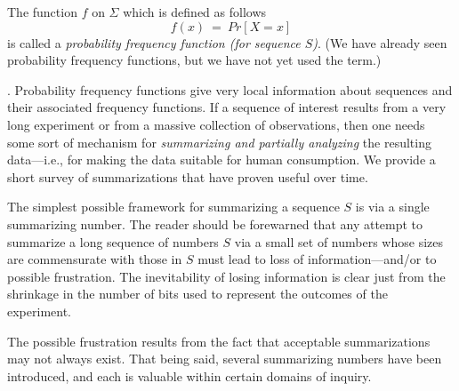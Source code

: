 \smallskip

The function $f$ on $\Sigma$ which is defined as follows
\[ f(x) \ = \ Pr[X=x] \]
is called a {\it probability frequency function (for sequence $S$)}.  (We have already seen probability frequency functions, but we have not yet used the term.)

\medskip

.
Probability frequency functions give very local information about sequences and their associated frequency functions.  If a sequence of interest results from a very long experiment or from a massive collection of observations, then one needs some sort of mechanism for {\em summarizing and partially analyzing} the resulting data---i.e., for making the data suitable for human consumption.  We provide a short survey of summarizations that have proven useful over time.

\medskip

The simplest possible framework for summarizing a sequence $S$ is via a single summarizing number. The reader should be forewarned that any attempt to summarize a long sequence of numbers $S$ via a small set of numbers whose sizes are commensurate with those in $S$ must lead to loss of information---and/or to possible frustration.  The inevitability of losing information is clear just from the shrinkage in the number of bits used to represent the outcomes of the experiment.

\bigskip

\noindent {}

\bigskip

\noindent
The possible frustration results from the fact that acceptable summarizations may not
always exist.   That being said, several summarizing numbers have been introduced, and
each is valuable within certain domains of inquiry. 


